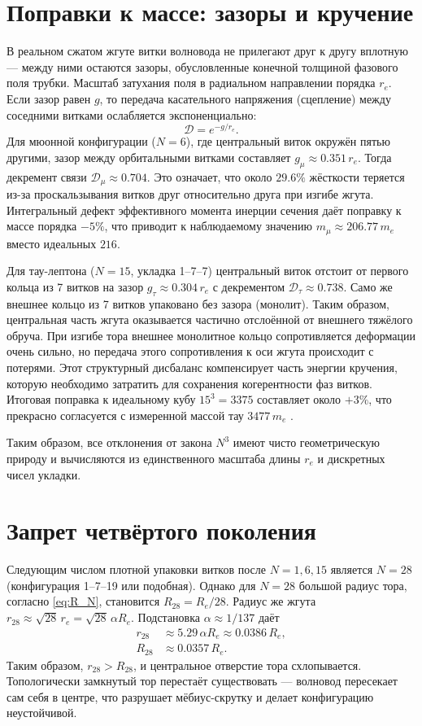 \documentclass[12pt,a4paper]{article}
\begin{document}
\section{Поправки к массе: зазоры и кручение}

В реальном сжатом жгуте витки волновода не прилегают друг к другу вплотную — между ними остаются зазоры, обусловленные конечной толщиной фазового поля трубки. Масштаб затухания поля в радиальном направлении порядка $r_e$. Если зазор равен $g$, то передача касательного напряжения (сцепление) между соседними витками ослабляется экспоненциально:
\begin{equation}
\mathcal{D} = e^{-g / r_e}.
\end{equation}
Для мюонной конфигурации ($N=6$), где центральный виток окружён пятью другими, зазор между орбитальными витками составляет $g_\mu \approx 0.351\,r_e$. Тогда декремент связи $\mathcal{D}_\mu \approx 0.704$. Это означает, что около $29.6\%$ жёсткости теряется из-за проскальзывания витков друг относительно друга при изгибе жгута. Интегральный дефект эффективного момента инерции сечения даёт поправку к массе порядка $-5\%$, что приводит к наблюдаемому значению $m_\mu \approx 206.77\,m_e$ вместо идеальных $216$.

Для тау-лептона ($N=15$, укладка 1--7--7) центральный виток отстоит от первого кольца из 7 витков на зазор $g_\tau \approx 0.304\,r_e$ с декрементом $\mathcal{D}_\tau \approx 0.738$. Само же внешнее кольцо из 7 витков упаковано без зазора (монолит). Таким образом, центральная часть жгута оказывается частично отслоённой от внешнего тяжёлого обруча. При изгибе тора внешнее монолитное кольцо сопротивляется деформации очень сильно, но передача этого сопротивления к оси жгута происходит с потерями. Этот структурный дисбаланс компенсирует часть энергии кручения, которую необходимо затратить для сохранения когерентности фаз витков. Итоговая поправка к идеальному кубу $15^3 = 3375$ составляет около $+3\%$, что прекрасно согласуется с измеренной массой тау $3477\,m_e$ \cite{pdg2024}.

Таким образом, все отклонения от закона $N^3$ имеют чисто геометрическую природу и вычисляются из единственного масштаба длины $r_e$ и дискретных чисел укладки.

\section{Запрет четвёртого поколения}

Следующим числом плотной упаковки витков после $N=1,6,15$ является $N=28$ (конфигурация 1--7--19 или подобная). Однако для $N=28$ большой радиус тора, согласно \eqref{eq:R_N}, становится $R_{28} = R_e/28$. Радиус же жгута $r_{28} \approx \sqrt{28}\,r_e = \sqrt{28}\,\alpha R_e$. Подстановка $\alpha \approx 1/137$ даёт
\begin{align}
r_{28} &\approx 5.29\,\alpha R_e \approx 0.0386\,R_e, \\
R_{28} &\approx 0.0357\,R_e.
\end{align}
Таким образом, $r_{28} > R_{28}$, и центральное отверстие тора схлопывается. Топологически замкнутый тор перестаёт существовать — волновод пересекает сам себя в центре, что разрушает мёбиус-скрутку и делает конфигурацию неустойчивой.
\end{document}
